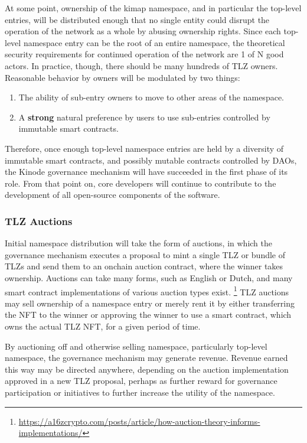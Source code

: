 \documentclass[runningheads]{llncs}
\begin{document}
At some point, ownership of the kimap namespace, and in particular the top-level entries, will be distributed enough that no single entity could disrupt the operation of the network as a whole by abusing ownership rights.
Since each top-level namespace entry can be the root of an entire namespace, the theoretical security requirements for continued operation of the network are 1 of N good actors.
In practice, though, there should be many hundreds of TLZ owners.
Reasonable behavior by owners will be modulated by two things:
\begin{enumerate}
    \item The ability of sub-entry owners to move to other areas of the namespace.
    \item A \textbf{strong} natural preference by users to use sub-entries controlled by immutable smart contracts.
\end{enumerate}

Therefore, once enough top-level namespace entries are held by a diversity of immutable smart contracts, and possibly mutable contracts controlled by DAOs, the Kinode governance mechanism will have succeeded in the first phase of its role.
From that point on, core developers will continue to contribute to the development of all open-source components of the software.

\subsubsection{TLZ Auctions}
\label{sec:daotldauctions}

Initial namespace distribution will take the form of auctions, in which the governance mechanism executes a proposal to mint a single TLZ or bundle of TLZs and send them to an onchain auction contract, where the winner takes ownership.
Auctions can take many forms, such as English or Dutch, and many smart contract implementations of various auction types exist.
\footnote{\url{https://a16zcrypto.com/posts/article/how-auction-theory-informs-implementations/}}
TLZ auctions may sell ownership of a namespace entry or merely rent it by either transferring the NFT to the winner or approving the winner to use a smart contract, which owns the actual TLZ NFT, for a given period of time.

By auctioning off and otherwise selling namespace, particularly top-level namespace, the governance mechanism may generate revenue.
Revenue earned this way may be directed anywhere, depending on the auction implementation approved in a new TLZ proposal, perhaps as further reward for governance participation or initiatives to further increase the utility of the namespace.
\end{document}
